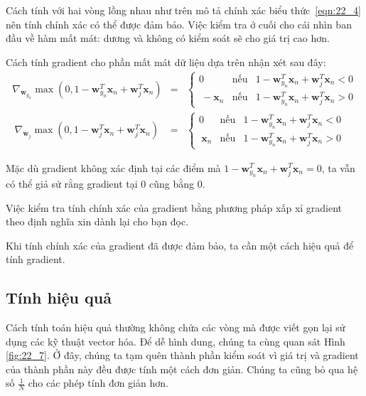  
Cách tính với hai vòng  lồng nhau như trên mô tả chính xác
biểu thức~\eqref{eqn:22_4} nên tính chính xác có thể được đảm bảo. Việc kiểm tra ở cuối cho cái nhìn ban đầu về hàm mất
mát: dương và không có kiểm soát sẽ cho giá trị cao hơn. 
 
Cách tính gradient cho phần mất mát dữ liệu dựa trên nhận xét sau
đây:
\begin{eqnarray} 
\label{eqn:22_5}
\nabla_{\mathbf{w}_{y_n}}\max(0, 1 - \mathbf{w}_{y_n}^T \mathbf{x}_n + \mathbf{w}_j^T\mathbf{x}_n) &=&  
\left\{ 
\begin{matrix} 
0 & \text{nếu}& 1 - \mathbf{w}_{y_n}^T \mathbf{x}_n + \mathbf{w}_j^T\mathbf{x}_n < 0 \\\ 
-\mathbf{x}_n & \text{nếu} &1 - \mathbf{w}_{y_n}^T \mathbf{x}_n + \mathbf{w}_j^T\mathbf{x}_n > 0 
\end{matrix} 
\right.\\\ 
\label{eqn:22_6}
\nabla_{\mathbf{w}_{j}}\max(0, 1 - \mathbf{w}_{j}^T \mathbf{x}_n + \mathbf{w}_j^T\mathbf{x}_n) &=&  
\left\{ 
\begin{matrix} 
0 & \text{nếu}& 1 - \mathbf{w}_{y_n}^T \mathbf{x}_n + \mathbf{w}_j^T\mathbf{x}_n < 0 \\\ 
\mathbf{x}_n & \text{nếu} &1 - \mathbf{w}_{y_n}^T \mathbf{x}_n + \mathbf{w}_j^T\mathbf{x}_n > 0 
\end{matrix} 
\right.  
\end{eqnarray} 
 
Mặc dù gradient không xác định tại các điểm mà $1 - \mathbf{w}_{y_n}^T \mathbf{x}_n + \mathbf{w}_j^T\mathbf{x}_n = 0$, ta vẫn có thể giả sử rằng gradient tại 0 cũng bằng 0.  

Việc kiểm tra tính chính xác của gradient bằng phương pháp xấp xỉ gradient theo định nghĩa xin dành lại cho bạn đọc. 
 
Khi tính chính xác của gradient đã được đảm bảo, ta cần một cách hiệu quả để tính gradient. 
 
 
 
\subsection{Tính hiệu quả}
 

Cách tính toán hiệu quả thường không chứa các vòng  mà được
viết gọn lại sử dụng các kỹ thuật vector hóa. Để dễ hình dung, chúng ta cùng
quan sát Hình \ref{fig:22_7}. Ở đây, chúng ta tạm quên thành phần kiểm soát vì
giá trị và gradient của thành phần này đều được tính một cách đơn giản. Chúng ta cũng
bỏ qua hệ số $\frac{1}{N}$ cho các phép tính đơn giản hơn.
 

